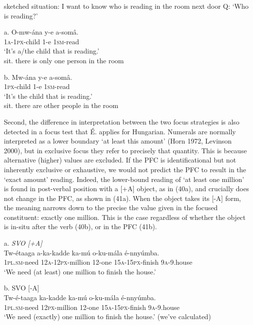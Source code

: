 \documentclass[output=paper]{langsci/langscibook}
\begin{document}
\ea
{sketched situation: I want to know who is reading in the room next door}
\glt   Q: ‘Who is reading?’
\z

\ea
\gll   a.  O-mw-ána  y-e  a-somâ.\\
         \textsc{1a}{}-\textsc{1px}{}-child  1-e  \textsc{1sm}{}-read\\
\glt     ‘It’s a/the child that is reading.’\\
sit. there is only one person in the room
\z

\ea
\gll   b.  Mw-ána  y-e  a-somâ.\\
         \textsc{1px}{}-child  1-e  \textsc{1sm}{}-read\\
\glt   ‘It’s the child that is reading.’\\
sit. there are other people in the room
\z

Second, the difference in interpretation between the two focus strategies is also detected in a focus test that É. \citet{Kiss2009} applies for Hungarian. Numerals are normally interpreted as a lower boundary ‘at least this amount’ (Horn 1972, Levinson 2000), but in exclusive focus they refer to precisely that quantity. This is because alternative (higher) values are excluded. If the PFC is identificational but not inherently exclusive or exhaustive, we would not predict the PFC to result in the ‘exact amount’ reading. Indeed, the lower-bound reading of ‘at least one million’ is found in post-verbal position with a [+A] object, as in (40a), and crucially does not change in the PFC, as shown in (41a). When the object takes its [-A] form, the meaning narrows down to the precise the value given in the focused constituent: exactly one million. This is the case regardless of whether the object is in-situ after the verb (40b), or in the PFC (41b).

\ea
{a.  \textit{SVO [+A]}}\\
\gll   Tw-étaaga  a-ka-kadde    ka-mú  o-ku-mála    é-nnyúmba.\\
       \textsc{1pl}.\textsc{sm}{}-need  \textsc{12a}{}-\textsc{12px}{}-million  12-one  \textsc{15a}{}-\textsc{15px}{}-finish  \textsc{9a}{}-9.house\\
\glt   ‘We need (at least) one million to finish the house.’
\z

\ea
{b.  SVO [-A]}\\
\gll Tw-é-taaga  ka-kadde  ka-mú  o-ku-mála    é-nnyúmba.\\
     \textsc{1pl}.\textsc{sm}{}-need  \textsc{12px}{}-million  12-one  \textsc{15a}{}-\textsc{15px}{}-finish  \textsc{9a}{}-9.house\\
\glt ‘We need (exactly) one million to finish the house.’ (we’ve calculated)
\z
\end{document}
